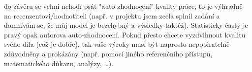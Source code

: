 \documentclass{scrartcl}
\begin{document}
do závěru se velmi nehodí psát "auto-zhodnocení" kvality práce, to je výhradně
na recenzentovi/hodnotiteli (např. v projektu jsem zcela splnil zadání a
domnívám se, že můj model je bezchybný a výsledky taktéž). Statisticky častý je
pravý opak autorova auto-zhodnocení. Pokud přesto chcete vyzdvihnout kvalitu
svého díla (což je dobře), tak vaše výroky musí být naprosto nepopiratelně
zdůvodněny a prokázány (např. pomocí jiného referenčního přístupu, matematického
důkazu, analýzy, \ldots{}).
\end{document}
